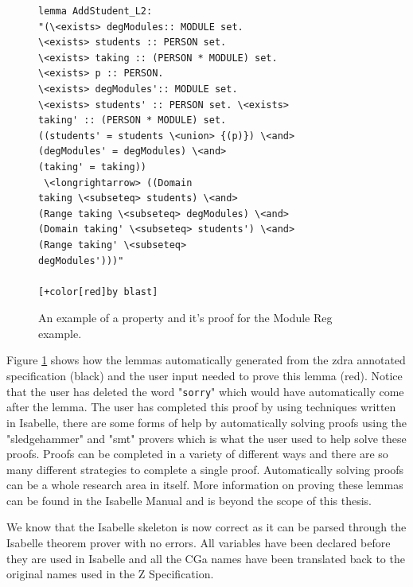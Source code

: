\begin{figure}[H]
\begin{minipage}{0.45\textwidth}
\begin{scriptsize}
\begin{BVerbatim}[commandchars=+\[\]]
lemma AddStudent_L2: 
"(\<exists> degModules:: MODULE set. 
\<exists> students :: PERSON set. 
\<exists> taking :: (PERSON * MODULE) set. 
\<exists> p :: PERSON.
\<exists> degModules':: MODULE set. 
\<exists> students' :: PERSON set. \<exists>
taking' :: (PERSON * MODULE) set. 
((students' = students \<union> {(p)}) \<and>
(degModules' = degModules) \<and> 
(taking' = taking))
 \<longrightarrow> ((Domain
taking \<subseteq> students) \<and> 
(Range taking \<subseteq> degModules) \<and>
(Domain taking' \<subseteq> students') \<and> 
(Range taking' \<subseteq>
degModules')))"

[+color[red]by blast]
\end{BVerbatim}
\end{scriptsize}
\end{minipage}
\caption{An example of a property and it's proof for the Module Reg example. \label{fig:propertyproof}}
\end{figure}

Figure \ref{fig:propertyproof} shows how the lemmas automatically generated from
the \gls{zdra} annotated specification (black) and the user input needed to
prove this lemma (red). Notice that the user has deleted the word
"\texttt{sorry}" which would have automatically come after the lemma.
The user has completed this proof by using techniques written in Isabelle, there are some forms of 
help by automatically solving proofs using the "sledgehammer" and "smt" provers which is what the 
user used to help solve these proofs.
Proofs can be completed in a variety of different ways and there are so many different strategies 
to complete a single proof. Automatically solving proofs can be a whole research area in itself.
More information on proving these lemmas can be found in the Isabelle Manual
\cite{isabelle} and is beyond the scope of this thesis.

We know that the Isabelle skeleton is now correct as it can be parsed through the 
Isabelle theorem prover with no errors.
All variables have been declared before they are used in Isabelle and all the CGa names
have been translated back to the original names used in the Z Specification.


